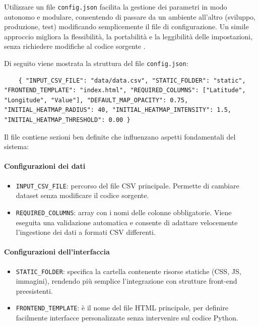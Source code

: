 Utilizzare un file \texttt{config.json} facilita la gestione dei parametri in
modo autonomo e modulare, consentendo di passare da un ambiente all'altro (sviluppo,
produzione, test) modificando semplicemente il file di configurazione. Un simile
approccio migliora la flessibilità, la portabilità e la leggibilità delle impostazioni,
senza richiedere modifiche al codice sorgente
\cite{understanding-config-json,config-files-types}.

Di seguito viene mostrata la struttura del file \texttt{config.json}:

\begin{listing}
  [H]
  \caption{Contenuto del file \texttt{config.json}}
  \label{lst:config_json} %
  \begin{verbatim}
    { "INPUT_CSV_FILE": "data/data.csv", "STATIC_FOLDER": "static", "FRONTEND_TEMPLATE": "index.html", "REQUIRED_COLUMNS": ["Latitude", "Longitude", "Value"], "DEFAULT_MAP_OPACITY": 0.75, "INITIAL_HEATMAP_RADIUS": 40, "INITIAL_HEATMAP_INTENSITY": 1.5, "INITIAL_HEATMAP_THRESHOLD": 0.00 }
  \end{verbatim}
\end{listing}

\noindent
Il file contiene sezioni ben definite che influenzano aspetti fondamentali del
sistema:

\paragraph{Configurazioni dei dati}
\begin{itemize}
  \item \texttt{INPUT\_CSV\_FILE}: percorso del file CSV principale. Permette di
    cambiare dataset senza modificare il codice sorgente.

  \item \texttt{REQUIRED\_COLUMNS}: array con i nomi delle colonne obbligatorie.
    Viene eseguita una validazione automatica e consente di adattare velocemente
    l'ingestione dei dati a formati CSV differenti.
\end{itemize}

\paragraph{Configurazioni dell'interfaccia}
\begin{itemize}
  \item \texttt{STATIC\_FOLDER}: specifica la cartella contenente risorse statiche
    (CSS, JS, immagini), rendendo più semplice l'integrazione con strutture
    front-end preesistenti.

  \item \texttt{FRONTEND\_TEMPLATE}: è il nome del file HTML principale, per
    definire facilmente interfacce personalizzate senza intervenire sul codice
    Python.
\end{itemize}


